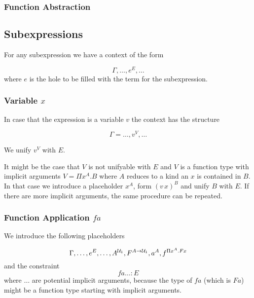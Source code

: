 \subsubsection{Function Abstraction}







\subsection{Subexpressions}

For any subexpression we have a context of the form

$$
\Gamma, \ldots, e^E, \ldots
$$
where $e$ is the hole to be filled with the term for the subexpression.







\subsubsection{Variable $x$}

In case that the expression is a variable $v$ the context has the structure

$$
\Gamma = \ldots, v^V, \ldots
$$

We unify $v^V$ with $E$.

It might be the case that $V$ is not unifyable with $E$ and $V$ is a function
type with implicit arguments $V = \Pi x^A.B$ where $A$ reduces to a kind an $x$
is contained in $B$. In that case we introduce a placeholder $x^A$, form $(v \,
x)^B$ and unify $B$ with $E$. If there are more implicit arguments, the same
procedure can be repeated.









\subsubsection{Function Application $f a$}

We introduce the following placeholders

$$
\Gamma, \ldots, e^E, \ldots, A^{{\cal{U}}_1}, F^{A\to{\cal{U}}_1}, a^A, f^{\Pi x^A. F x}
$$
and the constraint
$$
f a \ldots : E
$$
where $\ldots$ are potential implicit arguments, because
the type of $f a$ (which is $F a$) might be a function type starting with implicit
arguments.

